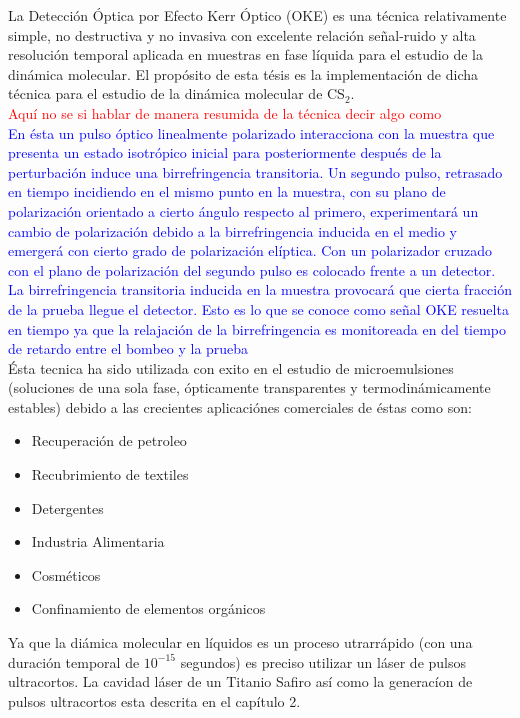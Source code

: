 La Detecci\'on \'Optica por Efecto Kerr \'Optico (OKE)\cite{steve} es una t\'ecnica relativamente simple, no destructiva y no invasiva con excelente relaci\'on se\~nal-ruido y alta resoluci\'on temporal aplicada en muestras en fase l\'iquida para el estudio de la din\'amica molecular. El propósito de esta t\'esis es la implementación de dicha técnica para el estudio de la din\'amica molecular de CS$_2$.\\
\textcolor{red}{Aqu\'i no se si hablar de manera resumida de la t\'ecnica decir algo como}\\
\textcolor{blue}{En \'esta un pulso \'optico linealmente polarizado interacciona con la muestra que presenta un estado isotr\'opico inicial para posteriormente despu\'es de la perturbaci\'on induce una birrefringencia transitoria. Un segundo pulso, retrasado en tiempo incidiendo en el mismo punto en la muestra, con su plano de polarizaci\'on orientado a cierto \'angulo respecto al primero, experimentar\'a un cambio de polarizaci\'on debido a la birrefringencia inducida en el medio y emerger\'a con cierto grado de polarizaci\'on el\'iptica. Con un polarizador cruzado con el plano de polarizaci\'on del segundo pulso es colocado frente a un detector. La birrefringencia transitoria inducida en la muestra provocar\'a que cierta fracci\'on de la prueba llegue el detector. Esto es lo que se conoce como se\~nal OKE resuelta en tiempo ya que la relajaci\'on de la birrefringencia es monitoreada en del tiempo de retardo entre el bombeo y la prueba}\\
\'Esta tecnica ha sido utilizada con exito en el estudio de microemulsiones\cite{andy} (soluciones de una sola fase, \'opticamente transparentes y termodin\'amicamente estables) debido a las crecientes aplicaci\'ones comerciales de \'estas como son\cite{microemul}:
\begin{itemize}
\item Recuperaci\'on de petroleo
\item Recubrimiento de textiles
\item Detergentes
\item Industria Alimentaria
\item Cosm\'eticos
\item Confinamiento de elementos org\'anicos
\end{itemize}

Ya que la di\'amica molecular en l\'iquidos es un proceso utrarr\'apido (con una duración temporal de $10^{-15}$ segundos) es preciso utilizar un l\'aser de pulsos ultracortos. La cavidad l\'aser de un Titanio Safiro as\'i como la generac\'ion de pulsos ultracortos esta descrita en el cap\'itulo 2.\\


